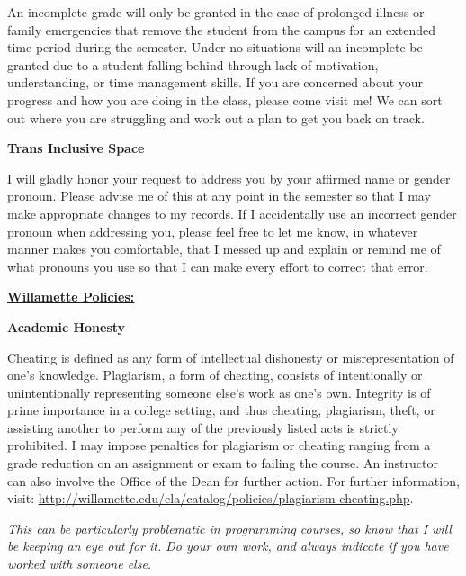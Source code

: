 \documentclass[11pt]{article}
\begin{document}
\hspace{3mm}
\hangindent=5mm An incomplete grade will only be granted in the case of prolonged illness or family emergencies that remove the student from the campus for an extended time period during the semester. Under no situations will an incomplete be granted due to a student falling behind through lack of motivation, understanding, or time management skills. If you are concerned about your progress and how you are doing in the class, please come visit me! We can sort out where you are struggling and work out a plan to get you back on track. 

\vspace{0.25cm}
\textbf{Trans Inclusive Space}

\hspace{3mm}
\hangindent=5mm I will gladly honor your request to address you by your affirmed name or gender pronoun. Please advise me of this at any point in the semester so that I may make appropriate changes to my records. If I accidentally use an incorrect gender pronoun when addressing you, please feel free to let me know, in whatever manner makes you comfortable, that I messed up and explain or remind me of what pronouns you use so that I can make every effort to correct that error.

\vspace{.5cm}
\newpage
\textbf {\large\underline{Willamette Policies:} }
\vspace{0.25cm}

\textbf{Academic Honesty}

\hspace{3mm}
\hangindent=5mm Cheating is defined as any form of intellectual dishonesty or misrepresentation of one's knowledge. Plagiarism, a form of cheating, consists of intentionally or unintentionally representing someone else's work as one's own. Integrity is of prime importance in a college setting, and thus cheating, plagiarism, theft, or assisting another to perform any of the previously listed acts is strictly prohibited. I may impose penalties for plagiarism or cheating ranging from a grade reduction on an assignment or exam to failing the course. An instructor can also involve the Office of the Dean for further action. For further information, visit: \url{http://willamette.edu/cla/catalog/policies/plagiarism-cheating.php}. 

\hspace{3mm}\hangindent=5mm \emph{This can be particularly problematic in programming courses, so know that I will be keeping an eye out for it. Do your own work, and always indicate if you have worked with someone else.}
\end{document}

